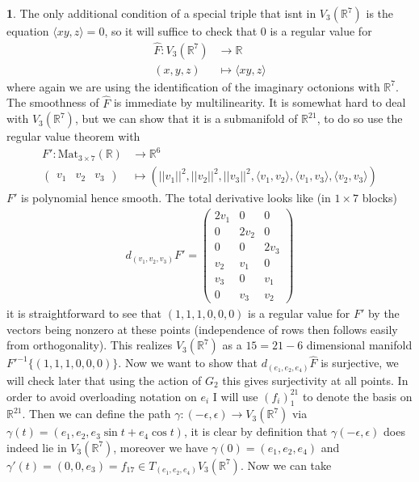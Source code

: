 \documentclass[10.5pt]{article}
\theoremstyle{definition}
\newtheorem{pb}{}
\newcommand{\set}[1]{\{#1\}}
\newcommand{\gen}[1]{\langle#1\rangle}
\newcommand{\norm}[1]{\lvert\lvert#1\rvert\rvert}
\begin{document}
\begin{pb}
        The only additional condition of a special triple that isnt in \(V_3(\mathbb{R}^7)\) is the equation \(\gen{xy,z} = 0\), so it will suffice to check that \(0\) is a regular value for
        \begin{align*}
            \hat{F}: V_3(\mathbb{R}^7) &\to \mathbb{R} \\
            (x,y,z) &\mapsto \gen{xy,z}
        \end{align*}
        where again we are using the identification of the imaginary octonions with \(\mathbb{R}^7\). The smoothness of \(\hat{F}\) is immediate by multilinearity. It is somewhat hard to deal with \(V_3(\mathbb{R}^7)\), but we can show that it is a submanifold of \(\mathbb{R}^{21}\), to do so use the regular value theorem with
        \begin{align*}
            F': \text{Mat}_{3\times 7}(\mathbb{R}) &\to \mathbb{R}^6 \\
            \begin{pmatrix} v_1&v_2&v_3 \end{pmatrix} &\mapsto (\norm{v_1}^2,\norm{v_2}^2,\norm{v_3}^2,\gen{v_1,v_2},\gen{v_1,v_3},\gen{v_2,v_3})
        \end{align*}
        \(F'\) is polynomial hence smooth. The total derivative looks like (in \(1 \times 7\) blocks)
        \begin{align*}
            d_{(v_1,v_2,v_3)}F' = \begin{pmatrix} 2v_1 & 0 & 0 \\ 0 & 2v_2 & 0 \\ 0&0& 2v_3 \\ v_2 & v_1 & 0 \\ v_3 & 0 & v_1 \\ 0 & v_3 & v_2 \end{pmatrix}
        \end{align*}
        it is straightforward to see that \((1,1,1,0,0,0)\) is a regular value for \(F'\) by the vectors being nonzero at these points (independence of rows then follows easily from orthogonality). This realizes \(V_3(\mathbb{R}^7)\) as a \(15 = 21 - 6\) dimensional manifold \(F'^{-1}\set{(1,1,1,0,0,0)}\). Now we want to show that \(d_{(e_1,e_2,e_4)}\hat{F}\) is surjective, we will check later that using the action of \(G_2\) this gives surjectivity at all points. In order to avoid overloading notation on \(e_i\) I will use \((f_i)_1^{21}\) to denote the basis on \(\mathbb{R}^{21}\). Then we can define the path \(\gamma: (-\epsilon,\epsilon) \to V_3(\mathbb{R}^7)\) via \(\gamma(t) = (e_1,e_2,e_3\sin t + e_4\cos t)\), it is clear by definition that \(\gamma(-\epsilon,\epsilon)\) does indeed lie in \(V_3(\mathbb{R}^7)\), moreover we have \(\gamma(0) = (e_1,e_2,e_4)\) and \(\gamma'(t) = (0,0,e_3) = f_{17} \in T_{(e_1,e_2,e_4)}V_3(\mathbb{R}^7)\). Now we can take 

\end{pb}
\end{document}
